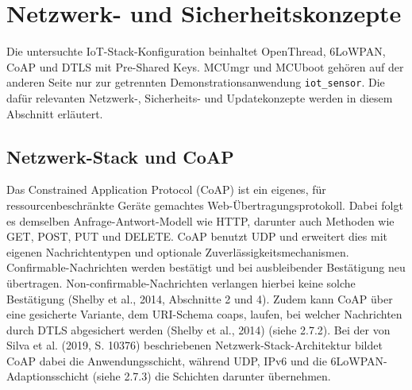 \section{Netzwerk- und Sicherheitskonzepte}
Die untersuchte IoT-Stack-Konfiguration beinhaltet OpenThread, 6LoWPAN, CoAP und DTLS mit Pre-Shared Keys. MCUmgr und MCUboot geh{\"o}ren auf der anderen Seite nur zur getrennten Demonstrationsanwendung \lstinline[style=codeinline]|iot_sensor|. Die daf{\"u}r relevanten Netzwerk-, Sicherheits- und Updatekonzepte werden in diesem Abschnitt erl{\"a}utert.

\subsection{Netzwerk-Stack und CoAP}
Das Constrained Application Protocol (CoAP) ist ein eigenes, f{\"u}r ressourcenbeschr{\"a}nkte Ger{\"a}te gemachtes Web-{\"U}bertragungsprotokoll. Dabei folgt es demselben Anfrage-Antwort-Modell wie HTTP, darunter auch Methoden wie GET, POST, PUT und DELETE. CoAP benutzt UDP und erweitert dies mit eigenen Nachrichtentypen und optionale Zuverl{\"a}ssigkeitsmechanismen. Confirmable-Nachrichten werden best{\"a}tigt und bei ausbleibender Best{\"a}tigung neu {\"u}bertragen. Non-confirmable-Nachrichten verlangen hierbei keine solche Best{\"a}tigung (Shelby et al., 2014, Abschnitte 2 und 4). Zudem kann CoAP {\"u}ber eine gesicherte Variante, dem URI-Schema \glqq{}coaps\grqq{}, laufen, bei welcher Nachrichten durch DTLS abgesichert werden (Shelby et al., 2014) (siehe 2.7.2). Bei der von Silva et al. (2019, S. 10376) beschriebenen Netzwerk-Stack-Architektur bildet CoAP dabei die Anwendungsschicht, w{\"a}hrend UDP, IPv6 und die 6LoWPAN-Adaptionsschicht (siehe 2.7.3) die Schichten darunter {\"u}bernehmen.

